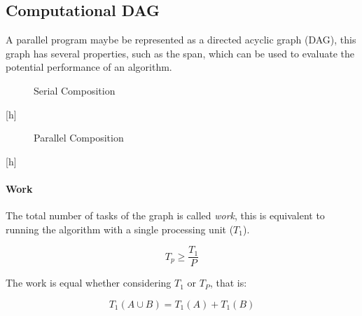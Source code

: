 
\subsection{Computational DAG}

A parallel program maybe be represented as a directed acyclic graph (DAG),
this graph has several properties, such as the span,
which can be used to evaluate the potential performance of an algorithm.

\begin{figure}[h]
    \centering
    \caption{Serial Composition}
    \label{fig:dag:serial}
\end{figure}[h]


\begin{figure}[h]
    \centering
    \caption{Parallel Composition}
    \label{fig:dag:parallel}
\end{figure}[h]

\paragraph{Work}

The total number of tasks of the graph is called \textit{work},
this is equivalent to running the algorithm with a single processing unit ($T_1$).

\begin{equation}\label{eq:work_law}
    T_p \ge \frac{T_1}{P}
\end{equation}

The work is equal whether considering $T_1$ or $T_P$,
that is:

\begin{equation}
    T_1 (A \cup B) = T_1(A) + T_1(B)
\end{equation}

